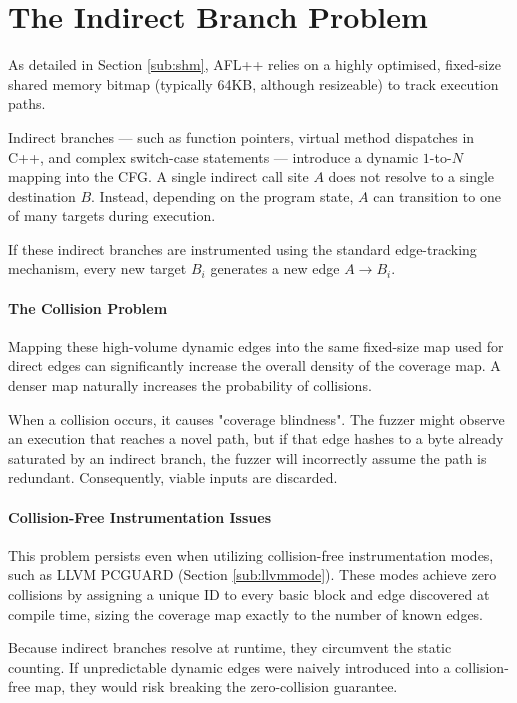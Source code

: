 \section{The Indirect Branch Problem}

As detailed in Section \ref{sub:shm}, AFL++ relies on a highly optimised, fixed-size shared memory bitmap (typically 64KB, although resizeable) to track execution paths. 

Indirect branches --- such as function pointers, virtual method dispatches in C++, and complex switch-case statements --- introduce a dynamic $1$-to-$N$ mapping into the CFG. A single indirect call site $A$ does not resolve to a single destination $B$. Instead, depending on the program state, $A$ can transition to one of many targets during execution.

If these indirect branches are instrumented using the standard edge-tracking mechanism, every new target $B_i$ generates a new edge $A \rightarrow B_i$.

\paragraph{The Collision Problem} Mapping these high-volume dynamic edges into the same fixed-size map used for direct edges can significantly increase the overall density of the coverage map. A denser map naturally increases the probability of collisions. 

When a collision occurs, it causes "coverage blindness". The fuzzer might observe an execution that reaches a novel path, but if that edge hashes to a byte already saturated by an indirect branch, the fuzzer will incorrectly assume the path is redundant. Consequently, viable inputs are discarded.

\paragraph{Collision-Free Instrumentation Issues} This problem persists even when utilizing collision-free instrumentation modes, such as LLVM PCGUARD (Section \ref{sub:llvmmode}). These modes achieve zero collisions by assigning a unique ID to every basic block and edge discovered at compile time, sizing the coverage map exactly to the number of known edges.

Because indirect branches resolve at runtime, they circumvent the static counting. If unpredictable dynamic edges were naively introduced into a collision-free map, they would risk breaking the zero-collision guarantee.

